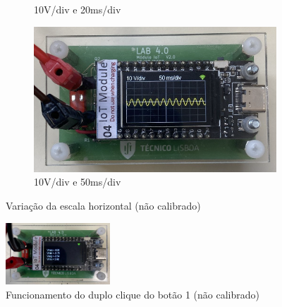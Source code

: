 \begin{figure}[H]
\begin{subfigure}{0.35\textwidth}
        \captionsetup{justification=centering}
        \caption{10V/div e 20ms/div}
        \label{fig:10V/div e 20ms/div horizontal não calibrado}
    \end{subfigure}
    \begin{subfigure}{0.35\textwidth}
        \centering
        \includegraphics[width=1\linewidth]{Imagens/Testes no laboratório/Não calibrado/Horizontal 50ms.png}
        \captionsetup{justification=centering}
        \caption{10V/div e 50ms/div}
        \label{fig:10V/div e 50ms/div não calibrado}
    \end{subfigure}
    \captionsetup{justification=centering}
    \caption{Variação da escala horizontal (não calibrado)}
    \label{fig:Variação da escala horizontal (não calibrado)}
\end{figure}

\begin{figure}[H]
    \centering
    \includegraphics[width=0.35\textwidth]{Imagens/Testes no laboratório/Não calibrado/Botão 13.jpeg}
    \captionsetup{justification=centering}
    \caption{Funcionamento do duplo clique do botão 1 (não calibrado)}
    \label{fig:Funcionamento do duplo clique do botão 1 (não calibrado)}
\end{figure}

\vspace{-0.25cm}

